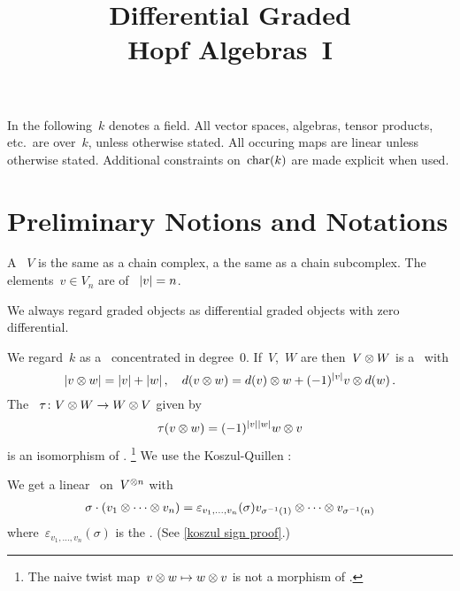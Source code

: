 \documentclass[a4paper,10pt,headings=standardclasses]{scrartcl}
\title{Differential Graded \\ Hopf Algebras~I}
\author{}
\date{}
\begin{document}
\maketitle

\vspace{-4em}

In the following~$k$ denotes a field.
All vector spaces, algebras, tensor products, etc.\ are over~$k$, unless otherwise stated.
All occuring maps are linear unless otherwise stated.
Additional constraints on~$\operatorname{char}(k)$ are made explicit when used.





\section{Preliminary Notions and Notations}

A ~$V$ is the same as a chain complex, a  the same as a chain subcomplex.
The elements~$v \in V_n$ are  of ~$\lvert v\rvert = n$.
\begin{center}
\end{center}
We always regard graded objects as differential graded objects with zero differential.
\begin{center}
\end{center}
We regard~$k$ as a~{\dgv} concentrated in degree~$0$.
If~$V$,~$W$ are {\dgvs} then~$V \otimes W$ is a {\dgv}~with
\[
  \lvert v \otimes w\rvert
  =
  \lvert v\rvert + \lvert w\rvert \,,
  \quad
  d(v \otimes w)
  =
  d(v) \otimes w + (-1)^{\lvert v\rvert} v \otimes d(w) \,.
\]
The ~$\tau \colon V \otimes W \to W \otimes V$ given by
\[
  \tau(v \otimes w)
  =
  (-1)^{\lvert v\rvert \lvert w\rvert}
  w \otimes v
\]
is an isomorphism of {\dgvs}.%
\footnote{The naive twist map~$v \otimes w \mapsto w \otimes v$ is not a morphism of {\dgvs}.}
We use the Koszul-Quillen :
\begin{center}
\end{center}
We get a linear~{} on~$V^{\otimes n}$ with
\begin{gather*}
  \sigma \cdot (v_1 \otimes \dotsb \otimes v_n)
  =
  \varepsilon_{v_1, \dotsc, v_n}(\sigma)
  v_{\sigma^{-1}(1)} \otimes \dotsb \otimes v_{\sigma^{-1}(n)}
\end{gather*}
where~$\varepsilon_{v_1, \dotsc, v_n}(\sigma)$ is the .
(See \cref{koszul sign proof}.)
\end{document}
